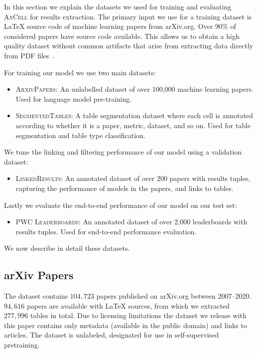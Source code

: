 \documentclass[11pt,a4paper]{article}
\newcommand{\model}{\textsc{AxCell}}
\newcommand{\unlabeled}{\textsc{ArxivPapers}}
\newcommand{\leaderboards}{\textsc{PWC Leaderboards}}
\newcommand{\linkedresults}{\textsc{LinkedResults}}
\newcommand{\finegrained}{\textsc{SegmentedTables}}
\newcommand{\arxiv}{arXiv.org}
\begin{document}
In this section we explain the datasets we used for training and evaluating \model{} for results extraction. The primary input we use for a training dataset is \LaTeX{} source code of machine learning papers from \arxiv{}. Over 90\% of considered papers have source code available. This allows us to obtain a high quality dataset without common artifacts that arise from extracting data directly from PDF files~\cite{ibm-extraction}.

For training our model we use two main datasets:

\begin{itemize}
  \item \unlabeled{}: An unlabelled dataset of over 100,000 machine learning papers. Used for language model pre-training.
  \item \finegrained{}: A table segmentation dataset where each cell is annotated according to whether it is a paper, metric, dataset, and so on. Used for table segmentation and table type classification.
\end{itemize}

We tune the linking and filtering performance of our model using a validation dataset:

\begin{itemize}
  \item \linkedresults{}: An annotated dataset of over 200 papers with results tuples, capturing the performance of models in the papers, and links to tables.
 \end{itemize}

Lastly we evaluate the end-to-end performance of our model on our test set:

\begin{itemize}
  \item \leaderboards{}: An annotated dataset of over 2,000 leaderboards with results tuples. Used for end-to-end performance evaluation.
\end{itemize}

We now describe in detail these datasets.

\subsection{arXiv Papers}
\label{sec:dataset:unlabeled}


The dataset contains $104,723$ papers published on \arxiv{} between 2007--2020. $94,616$ papers are available with \LaTeX{} sources, from which we extracted $277,996$ tables in total. 
Due to licensing limitations the dataset we release with this paper contains only metadata (available in the public domain) and links to articles. The dataset is unlabeled, designated for use in self-supervised pretraining.
\end{document}
